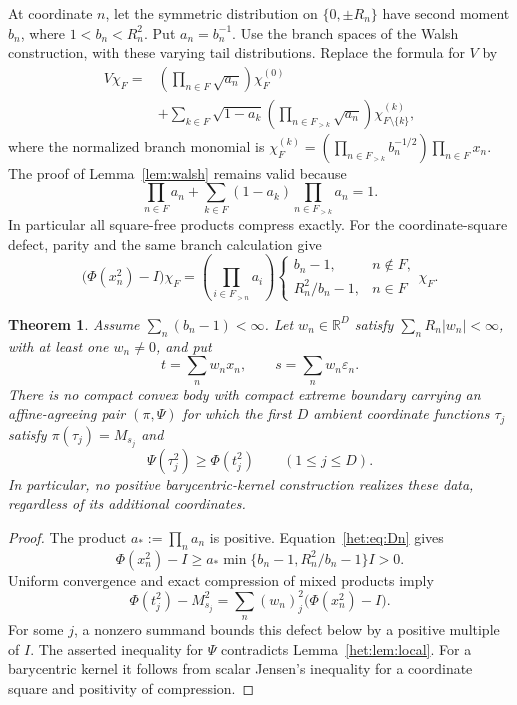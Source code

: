 \documentclass[11pt,letterpaper]{amsart}
\newtheorem{theorem}{Theorem}[section]
\theoremstyle{definition}
\theoremstyle{remark}
\numberwithin{equation}{section}
\newcommand{\R}{\mathbb R}
\begin{document}
At coordinate $n$, let the symmetric distribution on $\{0,\pm R_n\}$
have second moment $b_n$, where $1<b_n<R_n^2$. Put $a_n=b_n^{-1}$.
Use the branch spaces of the Walsh construction, with these varying
tail distributions. Replace the formula for $V$ by
\[
 \begin{split}
 V\chi_F={}&\left(\prod_{n\in F}\sqrt{a_n}\right)\chi_F^{(0)}\\
 &+\sum_{k\in F}\sqrt{1-a_k}
     \left(\prod_{n\in F_{>k}}\sqrt{a_n}\right)
       \chi_{F\setminus\{k\}}^{(k)},
 \end{split}
\]
where the normalized branch monomial is
$\chi_F^{(k)}=(\prod_{n\in F_{>k}}b_n^{-1/2})\prod_{n\in F}x_n$.
The proof of Lemma~\ref{lem:walsh} remains valid because
\[
 \prod_{n\in F}a_n+
 \sum_{k\in F}(1-a_k)\prod_{n\in F_{>k}}a_n=1.
\]
In particular all square-free products compress exactly. For the
coordinate-square defect, parity and the same branch calculation give
\begin{equation}\label{het:eq:Dn}
 \bigl(\Phi(x_n^2)-I\bigr)\chi_F
 =\left(\prod_{i\in F_{>n}}a_i\right)
 \begin{cases}
 b_n-1,&n\notin F,\\
 R_n^2/b_n-1,&n\in F
 \end{cases}
 \chi_F.
\end{equation}

\begin{theorem}\label{het:thm:obstruction}
Assume $\sum_n(b_n-1)<\infty$. Let $w_n\in\R^D$ satisfy
$\sum_n R_n|w_n|<\infty$, with at least one $w_n\ne0$, and put
\[
                       t=\sum_n w_nx_n,
                       \qquad s=\sum_nw_n\varepsilon_n.
\]
There is no compact convex body with compact extreme boundary carrying
an affine-agreeing pair $(\pi,\Psi)$ for which the first $D$ ambient
coordinate functions $\tau_j$ satisfy $\pi(\tau_j)=M_{s_j}$ and
\[
                         \Psi(\tau_j^2)\ge\Phi(t_j^2)
                         \qquad(1\le j\le D).
\]
In particular, no positive barycentric-kernel construction realizes
these data, regardless of its additional coordinates.
\end{theorem}
\begin{proof}
The product $a_*:=\prod_n a_n$ is positive. Equation~\eqref{het:eq:Dn}
gives
\[
 \Phi(x_n^2)-I\ge
 a_*\min\{b_n-1,R_n^2/b_n-1\}I>0.
\]
Uniform convergence and exact compression of mixed products imply
\[
 \Phi(t_j^2)-M_{s_j}^2
       =\sum_n(w_n)_j^2\bigl(\Phi(x_n^2)-I\bigr).
\]
For some $j$, a nonzero summand bounds this defect below by a positive
multiple of $I$. The asserted inequality for $\Psi$ contradicts
Lemma~\ref{het:lem:local}. For a barycentric kernel it follows from
scalar Jensen's inequality for a coordinate square and positivity of
compression.
\end{proof}
\end{document}

